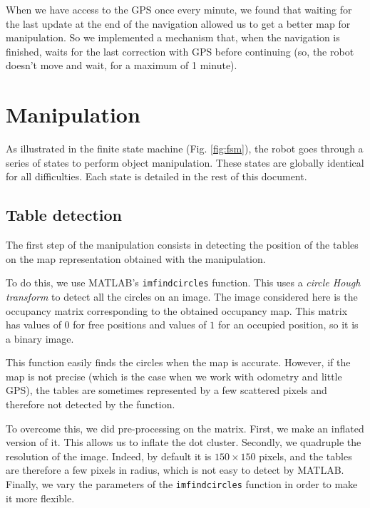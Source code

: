 \documentclass[a4paper, 10pt, conference]{ieeeconf}
\begin{document}
    When we have access to the GPS once every minute, we found that waiting for the last update at the end of the navigation allowed us to get a better map for manipulation. So we implemented a mechanism that, when the navigation is finished, waits for the last correction with GPS before continuing (so, the robot doesn't move and wait, for a maximum of 1 minute).
    
    
    \section{Manipulation}\label{sec:manipulation}
    
    As illustrated in the finite state machine (Fig. \ref{fig:fsm}), the robot goes through a series of states to perform object manipulation. These states are globally identical for all difficulties. Each state is detailed in the rest of this document.
    
    \subsection{Table detection}
    
    The first step of the manipulation consists in detecting the position of the tables on the map representation obtained with the manipulation.
    
    To do this, we use MATLAB's \texttt{imfindcircles} function. This uses a \emph{circle Hough transform} to detect all the circles on an image. The image considered here is the occupancy matrix corresponding to the obtained occupancy map. This matrix has values of $0$ for free positions and values of $1$ for an occupied position, so it is a binary image.
    
    This function easily finds the circles when the map is accurate. However, if the map is not precise (which is the case when we work with odometry and little GPS), the tables are sometimes represented by a few scattered pixels and therefore not detected by the function.
    
    To overcome this, we did pre-processing on the matrix. First, we make an inflated version of it. This allows us to inflate the dot cluster. Secondly, we quadruple the resolution of the image. Indeed, by default it is $150\times150$ pixels, and the tables are therefore a few pixels in radius, which is not easy to detect by MATLAB. Finally, we vary the parameters of the \texttt{imfindcircles} function in order to make it more flexible.
    
\end{document}
